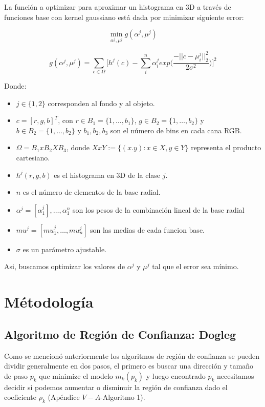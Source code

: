 \documentclass[conference]{IEEEtran}
\begin{document}
La función a optimizar para aproximar un histograma en 3D a través de funciones base con
kernel gaussiano está dada por minimizar siguiente error:

\begin{equation*}
	\min_{\alpha^j, \mu^j} g(\alpha^j, \mu^j)
\end{equation*}

\begin{equation}
	g(\alpha^j, \mu^j) =
	\sum_{c \in \Omega} \Big[ h^j(c)
	- \sum_i^n \alpha_i^j exp\big( \frac{-||c - \mu_i^j||_2^2}{2\sigma^2} \big) \Big]^2
\end{equation}

Donde:

\begin{itemize}
	\item $j \in \{1,2\}$ corresponden al fondo y al objeto.
	\item $c = [r,g,b]^T$, con $r \in B_1 = \{1,\dots, b_1\}$, $g \in B_2 = \{1,\dots, b_2\}$ y
	$b \in B_2 = \{1,\dots, b_2\}$ y $b_1, b_2, b_3$ son el número de bins en cada cana RGB.
	\item $\Omega = B_1 x B_2 X B_3$, donde $X x Y := \{(x.y): x \in X, y \in Y\}$ representa el
	producto cartesiano.
	\item $h^j(r,g,b)$ es el histograma en 3D de la clase $j$.
	\item $n$ es el número de elementos de la base radial.
	\item $\alpha^j = [\alpha_1^j], \dots, \alpha_1^n$ son los pesos de la combinación lineal de la
	base radial
	\item $mu^j = [mu^j_1, \dots, mu^j_n]$ son las medias de cada funcion base.
	\item $\sigma$ es un parámetro ajustable.
\end{itemize}

Asi, buscamos optimizar los valores de $\alpha^j$ y $\mu^j$ tal que el error sea mínimo.

\section{Métodología}

\subsection{Algoritmo de Región de Confianza: Dogleg}

Como se mencionó anteriormente los algoritmos de región de confianza se pueden dividir generalmente
en dos pasos, el primero es buscar una dirección y tamaño de paso $p_k$ que minimize el modelo
$m_k(p_k)$ y luego encontrado $p_k$ necesitamos decidir si podemos aumentar o disminuir la región de
confianza dado el coeficiente $\rho_k$ (Apéndice $V-A$-Algoritmo 1).
\end{document}
